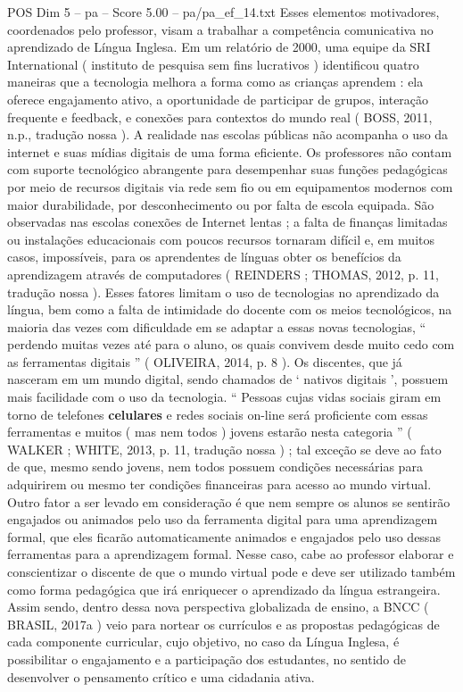\begin{textsample}{POS Dim 5 – pa – Score 5.00 – pa/pa\_ef\_14.txt}
Esses elementos motivadores, coordenados pelo professor, visam a trabalhar a competência comunicativa no aprendizado de Língua Inglesa.
Em um relatório de 2000, uma equipe da SRI International ( instituto de pesquisa sem fins lucrativos ) identificou quatro maneiras que a tecnologia melhora a forma como as crianças aprendem : ela oferece engajamento ativo, a oportunidade de participar de grupos, interação frequente e feedback, e conexões para contextos do mundo real ( BOSS, 2011, n.p., tradução nossa ).
A realidade nas escolas públicas não acompanha o uso da internet e suas mídias digitais de uma forma eficiente.
Os professores não contam com suporte tecnológico abrangente para desempenhar suas funções pedagógicas por meio de recursos digitais via rede sem fio ou em equipamentos modernos com maior durabilidade, por desconhecimento ou por falta de escola equipada.
São observadas nas escolas conexões de Internet lentas ; a falta de finanças limitadas ou instalações educacionais com poucos recursos tornaram difícil e, em muitos casos, impossíveis, para os aprendentes de línguas obter os benefícios da aprendizagem através de computadores ( REINDERS ; THOMAS, 2012, p. 11, tradução nossa ).
Esses fatores limitam o uso de tecnologias no aprendizado da língua, bem como a falta de intimidade do docente com os meios tecnológicos, na maioria das vezes com dificuldade em se adaptar a essas novas tecnologias, “ perdendo muitas vezes até para o aluno, os quais convivem desde muito cedo com as ferramentas digitais ” ( OLIVEIRA, 2014, p. 8 ).
Os discentes, que já nasceram em um mundo digital, sendo chamados de ‘ nativos digitais ’, possuem mais facilidade com o uso da tecnologia. “ Pessoas cujas vidas sociais giram em torno de telefones \textbf{celulares} e redes sociais on-line será proficiente com essas ferramentas e muitos ( mas nem todos ) jovens estarão nesta categoria ” ( WALKER ; WHITE, 2013, p. 11, tradução nossa ) ; tal exceção se deve ao fato de que, mesmo sendo jovens, nem todos possuem condições necessárias para adquirirem ou mesmo ter condições financeiras para acesso ao mundo virtual.
Outro fator a ser levado em consideração é que nem sempre os alunos se sentirão engajados ou animados pelo uso da ferramenta digital para uma aprendizagem formal, que eles ficarão automaticamente animados e engajados pelo uso dessas ferramentas para a aprendizagem formal.
Nesse caso, cabe ao professor elaborar e conscientizar o discente de que o mundo virtual pode e deve ser utilizado também como forma pedagógica que irá enriquecer o aprendizado da língua estrangeira.
Assim sendo, dentro dessa nova perspectiva globalizada de ensino, a BNCC ( BRASIL, 2017a ) veio para nortear os currículos e as propostas pedagógicas de cada componente curricular, cujo objetivo, no caso da Língua Inglesa, é possibilitar o engajamento e a participação dos estudantes, no sentido de desenvolver o pensamento crítico e uma cidadania ativa.

\end{textsample}
